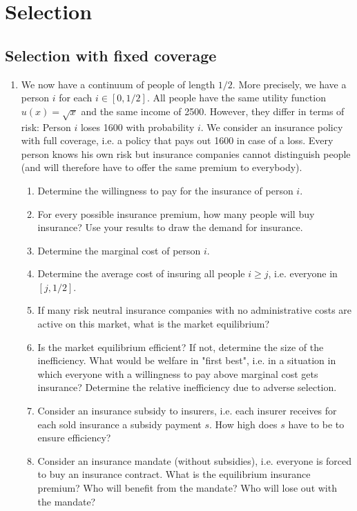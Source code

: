 \documentclass[a4paper]{article}
\begin{document}
\section{Selection}
\label{sec:org8ed30ca}
\subsection{Selection with fixed coverage}
\label{sec:orgd914bdf}
\begin{enumerate}[resume]
\item We now have a continuum of people of length \(1/2\). More precisely, we have a person \(i\) for each \(i\in[0,1/2]\). All people have the same utility function \(u(x)=\sqrt{x}\) and the same income of 2500. However, they differ in terms of risk: Person \(i\) loses 1600 with probability \(i\). We consider an insurance policy with full coverage, i.e. a policy that pays out 1600 in case of a loss. Every person knows his own risk but insurance companies cannot distinguish people (and will therefore have to offer the same premium to everybody). 
\begin{enumerate}
\item Determine the willingness to pay for the insurance of person \(i\).
\item For every possible insurance premium, how many people will buy insurance? Use your results to draw the demand for insurance.
\item Determine the marginal cost of person \(i\).
\item Determine the average cost of insuring all people \(i\geq j\), i.e. everyone in \([j,1/2]\).
\item If many risk neutral insurance companies with no administrative costs are active on this market, what is the market equilibrium?
\item Is the market equilibrium efficient? If not, determine the size of the inefficiency. What would be welfare in "first best", i.e. in a situation in which everyone with a willingness to pay above marginal cost gets insurance? Determine the relative inefficiency due to adverse selection.
\item Consider an insurance subsidy to insurers, i.e. each insurer receives for each sold insurance a subsidy payment \(s\). How high does \(s\) have to be to ensure efficiency?
\item Consider an insurance mandate (without subsidies), i.e. everyone is forced to buy an insurance contract. What is the equilibrium insurance premium? Who will benefit from the mandate? Who will lose out with the mandate?

\end{enumerate}
\end{enumerate}
\end{document}
